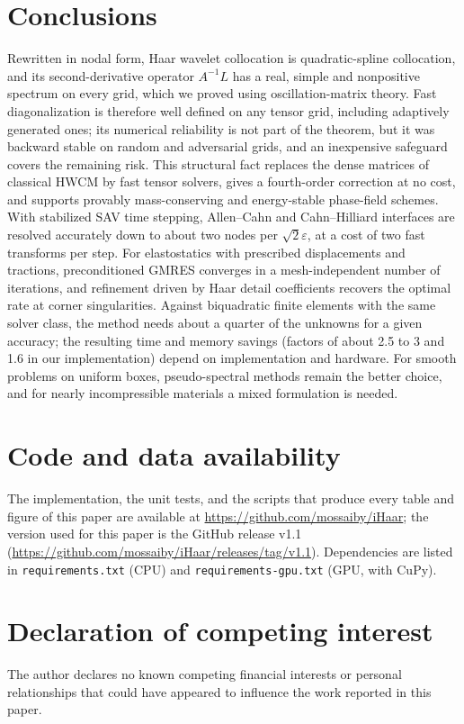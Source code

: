 \documentclass[preprint,12pt]{elsarticle}
\theoremstyle{remark}
\newcommand{\repo}{\url{https://github.com/mossaiby/iHaar}}
\newcommand{\archive}{\url{https://github.com/mossaiby/iHaar/releases/tag/v1.1}}
\begin{document}
\section{Conclusions}
Rewritten in nodal form, Haar wavelet collocation is quadratic-spline collocation, and its
second-derivative operator $A^{-1}L$ has a real, simple and nonpositive spectrum on every grid, which we proved using oscillation-matrix theory. Fast diagonalization is therefore well defined on any
tensor grid, including adaptively generated ones; its numerical reliability is not part of the theorem, but
it was backward stable on random and adversarial grids, and an inexpensive safeguard covers the remaining
risk. This structural fact replaces the dense matrices of classical HWCM by fast tensor
solvers, gives a fourth-order correction at no cost, and supports provably mass-conserving and
energy-stable phase-field schemes. With stabilized SAV time stepping, Allen--Cahn and Cahn--Hilliard
interfaces are resolved accurately down to about two nodes per $\sqrt2\varepsilon$, at a cost of two fast
transforms per step. For elastostatics with prescribed displacements and tractions, preconditioned GMRES
converges in a mesh-independent number of iterations, and refinement driven by Haar detail coefficients
recovers the optimal rate at corner singularities. Against biquadratic finite elements with the same solver class, the method needs about a quarter of the
unknowns for a given accuracy; the resulting time and memory savings (factors of about 2.5 to 3 and 1.6 in
our implementation) depend on implementation and hardware. For smooth problems on uniform boxes, pseudo-spectral methods remain the better choice, and for
nearly incompressible materials a mixed formulation is needed.

\section*{Code and data availability}
The implementation, the unit tests, and the scripts that produce every table and figure of this paper
are available at \repo; the version used for this paper is the GitHub release v1.1 (\archive). Dependencies are listed in \texttt{requirements.txt} (CPU) and
\texttt{requirements-gpu.txt} (GPU, with CuPy).

\section*{Declaration of competing interest}
The author declares no known competing financial interests or personal relationships that could have
appeared to influence the work reported in this paper.
\end{document}
